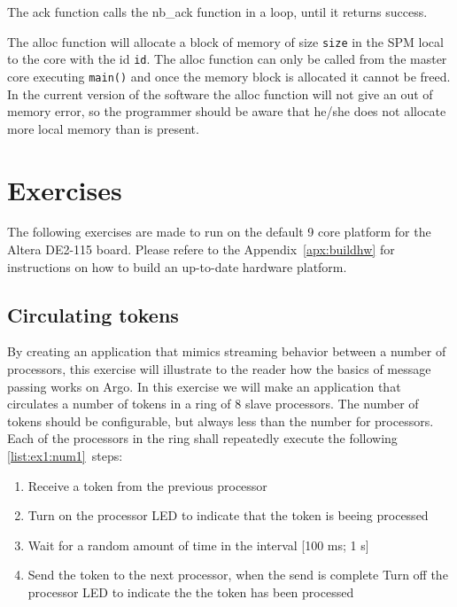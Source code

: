 \documentclass[a4paper,fontsize=10pt,twoside,DIV15,BCOR12mm,headinclude=true,footinclude=false,pagesize,bibtotoc]{scrbook}
\newcommand{\code}[1]{{\texttt{#1}}}
\renewenvironment{description}%
{
\begin{basedescript}{
\desclabelstyle{\nextlinelabel}
\renewcommand{\makelabel}[1]{%
\parbox[b]{\textwidth}{\bfseries##1}%
}%
\desclabelwidth{2em}}}
{
\end{basedescript}
}
\begin{document}
\begin{description}
The ack function calls the nb\_ack function in a loop, until it returns success.

\item[\code{void \_SPM * mp\_alloc( coreid\_t id, unsigned size )}]

The alloc function will allocate a block of memory of size
\code{size} in the SPM local to the core with the id \code{id}.
The alloc function can only be called from the master core executing \code{main()}
and once the memory block is allocated it cannot be freed.
In the current version of the software the alloc function will not
give an out of memory error, so the programmer should be aware
that he/she does not allocate more local memory than is present.

\end{description}


\chapter{Exercises}
\label{chap:exercise}

The following exercises are made to run on the default
9 core platform for the Altera DE2-115 board.
Please refere to the Appendix~\ref{apx:buildhw} for instructions on
how to build an up-to-date hardware platform.

\section{Circulating tokens}
By creating an application that mimics streaming behavior between a number of processors, this exercise will illustrate to the reader how the basics of message passing works on Argo.
In this exercise we will make an application that circulates a number of tokens in a ring of 8 slave processors.
The number of tokens should be configurable, but always less than the number for processors.
Each of the processors in the ring shall repeatedly execute the following \ref{list:ex1:num1}~steps:

\begin{framed}
\begin{enumerate}
\item Receive a token from the previous processor

\item Turn on the processor LED to indicate that the token is beeing processed

\item Wait for a random amount of time in the interval [100 ms; 1 s]
\label{list:step_rand}
\item Send the token to the next processor, when the send is complete Turn off the processor LED to indicate the the token has been processed

\label{list:ex1:num1}\end{enumerate}
\end{framed}
\end{document}
